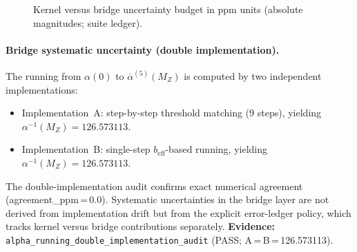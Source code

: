 \begin{figure}[H]
\centering
{}
\caption{Kernel versus bridge uncertainty budget in ppm units (absolute magnitudes; suite ledger).}
\label{fig:error-ledger}
\end{figure}

\paragraph{Bridge systematic uncertainty (double implementation).}
The running from $\alpha(0)$ to $\overline{\alpha}^{(5)}(M_Z)$ is computed by two
independent implementations:
\begin{itemize}[leftmargin=1.5em, topsep=2pt, itemsep=1pt]
    \item Implementation~A: step-by-step threshold matching (9 steps), yielding
          $\alpha^{-1}(M_Z)=126.573113$.
    \item Implementation~B: single-step $b_{\mathrm{eff}}$-based running, yielding
          $\alpha^{-1}(M_Z)=126.573113$.
\end{itemize}
The double-implementation audit confirms exact numerical agreement (agreement\_ppm\,=\,0.0).
Systematic uncertainties in the bridge layer are not derived from implementation drift
but from the explicit error-ledger policy, which tracks kernel versus bridge contributions separately.
\textbf{Evidence:} \texttt{alpha\_running\_double\_implementation\_audit} (PASS; A\,=\,B\,=\,126.573113).

